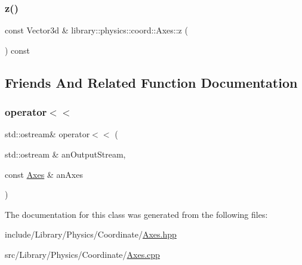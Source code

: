 \subsubsection{\texorpdfstring{z()}{z()}}
{\footnotesize\ttfamily const Vector3d \& library\+::physics\+::coord\+::\+Axes\+::z (\begin{DoxyParamCaption}{ }\end{DoxyParamCaption}) const}



\subsection{Friends And Related Function Documentation}
\mbox{\label{classlibrary_1_1physics_1_1coord_1_1_axes_a0ed7e604ae11f069877a8ee1a2d9b051}} 
\subsubsection{\texorpdfstring{operator$<$$<$}{operator<<}}
{\footnotesize\ttfamily std\+::ostream\& operator$<$$<$ (\begin{DoxyParamCaption}\item[{std\+::ostream \&}]{an\+Output\+Stream,  }\item[{const \hyperlink{classlibrary_1_1physics_1_1coord_1_1_axes}{Axes} \&}]{an\+Axes }\end{DoxyParamCaption})\hspace{0.3cm}{\ttfamily [friend]}}



The documentation for this class was generated from the following files\+:\begin{DoxyCompactItemize}
\item 
include/\+Library/\+Physics/\+Coordinate/\hyperlink{_axes_8hpp}{Axes.\+hpp}\item 
src/\+Library/\+Physics/\+Coordinate/\hyperlink{_axes_8cpp}{Axes.\+cpp}\end{DoxyCompactItemize}
